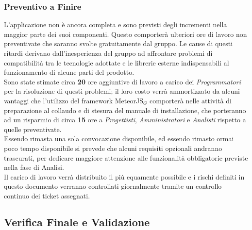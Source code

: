 \subsubsection{Preventivo a Finire}
L'applicazione non è ancora completa e sono previsti degli incrementi nella maggior parte dei suoi componenti. Questo comporterà ulteriori ore di lavoro non preventivate che saranno svolte gratuitamente dal gruppo. Le cause di questi ritardi derivano dall'inesperienza del gruppo ad affrontare problemi di compatibilità tra le tecnologie adottate e le librerie esterne indispensabili al funzionamento di alcune parti del prodotto. \\
Sono state stimate circa \textbf{20} ore aggiuntive di lavoro a carico dei \textit{Programmatori} per la risoluzione di questi problemi; il loro costo verrà ammortizzato da alcuni vantaggi che l'utilizzo del framework MeteorJS$_G$ comporterà nelle attività di preparazione al collaudo e di stesura del manuale di installazione, che porteranno ad un risparmio di circa \textbf{15} ore a \textit{Progettisti}, \textit{Amministratori} e \textit{Analisti} rispetto a quelle preventivate. \\
Essendo rimasta una sola convocazione disponibile, ed essendo rimasto ormai poco tempo disponibile si prevede che alcuni requisiti opzionali andranno trascurati, per dedicare maggiore attenzione alle funzionalità obbligatorie previste nella fase di Analisi. \\
Il carico di lavoro verrà distribuito il più equamente possibile e i rischi definiti in questo documento verranno controllati giornalmente tramite un controllo continuo dei ticket assegnati.








\clearpage
\subsection{Verifica Finale e Validazione}

